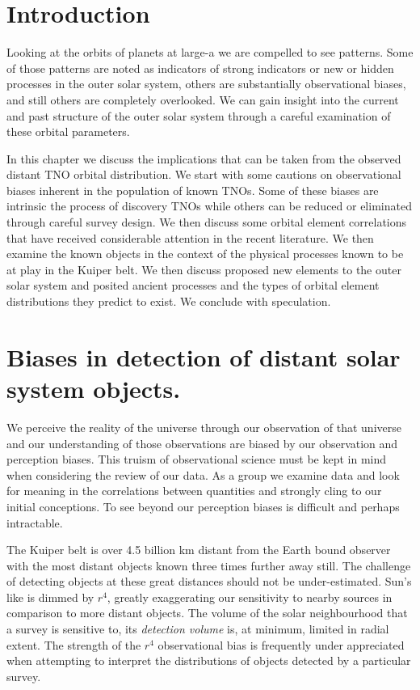 \documentclass{aastex62}
\begin{document}
\section{Introduction}

Looking at the orbits of planets at large-a we are compelled to see patterns. Some of those patterns are noted as indicators of strong indicators or new or hidden processes in the outer solar system, others are substantially observational biases, and still others are completely overlooked. We can gain insight into the current and past structure of the outer solar system through a careful examination of these orbital parameters. 

In this chapter we discuss the implications that can be taken from the observed distant TNO orbital distribution.  We start with some cautions on observational biases inherent in the population of known TNOs.  Some of these biases are intrinsic the process of discovery TNOs while others can be reduced or eliminated through careful survey design. We then discuss some orbital element correlations that have received considerable attention in the recent literature. We then examine the known objects in the context of the physical processes known to be at play in the Kuiper belt.  We then discuss proposed new elements to the outer solar system and posited ancient processes and the types of orbital element distributions they predict to exist.  We conclude with speculation.

\section{Biases in detection of distant solar system objects.}

We perceive the reality of the universe through our observation of that universe and our understanding of those observations are biased by our observation and perception biases. This truism of observational science must be kept in mind when considering the review of our data. As a group we examine data and look for meaning in the correlations between quantities and strongly cling to our initial conceptions.  To see beyond our perception biases is difficult and perhaps intractable. 

The Kuiper belt is over 4.5 billion km distant from the Earth bound observer with the most distant objects known three times further away still.  The challenge of detecting objects at these great distances should not be under-estimated.  Sun's like is dimmed by $r^4$, greatly exaggerating our sensitivity to nearby sources in comparison to more distant objects.  The volume of the solar neighbourhood that a survey is sensitive to, its {\it detection volume}  is, at minimum, limited in radial extent. The strength of the $r^4$ observational bias is frequently under appreciated when attempting to interpret the distributions of objects detected by a particular survey.
\end{document}
